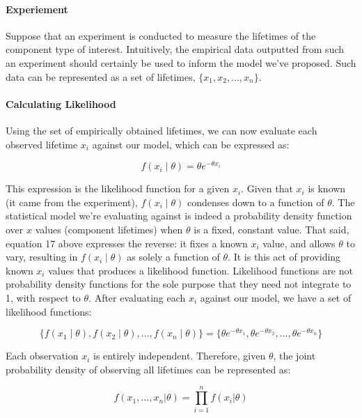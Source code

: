 \documentclass[12pt]{article}
\begin{document}
\paragraph{Experiement}
Suppose that an experiment is conducted to measure the lifetimes of the component type of interest. Intuitively, the empirical data outputted from such an experiment should certainly be used to inform the model we've proposed. Such data can be represented as a set of lifetimes, $\{x_1, x_2, ..., x_n\}$. 


\paragraph{Calculating Likelihood}
Using the set of empirically obtained lifetimes, we can now evaluate each observed lifetime $x_i$ against our model, which can be expressed as:

\begin{equation}
 f(x_i \mid \theta) = \theta e^{-\theta x_i}
\end{equation}

\noindent This expression is the likelihood function for a given $x_i$. Given that $x_i$ is known (it came from the experiment), $f(x_i \mid \theta)$ condenses down to a function of $\theta$. The statistical model we're evaluating against is indeed a probability density function over $x$ values (component lifetimes) when $\theta$ is a fixed, constant value. That said, equation 17 above expresses the reverse: it fixes a known $x_i$ value, and allows $\theta$ to vary, resulting in $f(x_i \mid \theta)$ as solely a function of $\theta$. It is this act of providing known $x_i$ values that produces a likelihood function. Likelihood functions are not probability density functions for the sole purpose that they need not integrate to 1, with respect to $\theta$. After evaluating each $x_i$ against our model, we have a set of likelihood functions:

\begin{equation}
\{f(x_1 \mid \theta), f(x_2 \mid \theta), ..., f(x_n \mid \theta)\} = \{\theta e^{-\theta x_1}, \theta e^{-\theta x_2}, ..., \theta e^{-\theta x_n}\}
\end{equation}

\noindent Each observation $x_i$ is entirely independent. Therefore, given $\theta$, the joint probability density of observing all lifetimes can be represented as:

\begin{equation}
f(x_1, \ldots, x_n|\theta) = \prod_{i=1}^n f(x_i|\theta)
\end{equation}
\end{document}
